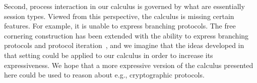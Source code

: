 \documentclass[twoside,11pt,final]{entics}
\begin{document}
Second, process interaction in our calculus is governed by what are essentially session types. Viewed from this perspective, the calculus is missing certain features. For example, it is unable to express branching protocols. The free cornering construction has been extended with the ability to express branching protocols and protocol iteration~\cite{Nester2024}, and we imagine that the ideas developed in that setting could be applied to our calculus in order to increase its expressiveness. We hope that a more expressive version of the calculus presented here could be used to reason about e.g., cryptographic protocols.



\end{document}
